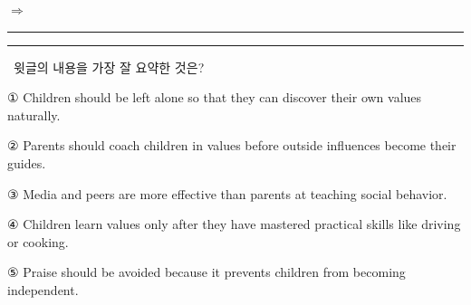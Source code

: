 \documentclass[11pt,a4paper]{article}
\newcommand{\qno}[1]{\par\vspace{8pt}\noindent{\sffamily\bfseries #1.}\ }
\newcommand{\instr}[1]{{\sffamily #1}\par\vspace{3pt}}
\begin{document}
\noindent $\Rightarrow$ \rule{\linewidth}{0.4pt}

\vspace{4pt}
\noindent \rule{\linewidth}{0.4pt}

\qno{4}\instr{윗글의 내용을 가장 잘 요약한 것은?}
\begin{choices}
\item ① Children should be left alone so that they can discover their own values naturally.
\item ② Parents should coach children in values before outside influences become their guides.
\item ③ Media and peers are more effective than parents at teaching social behavior.
\item ④ Children learn values only after they have mastered practical skills like driving or cooking.
\item ⑤ Praise should be avoided because it prevents children from becoming independent.
\end{choices}
\end{document}
